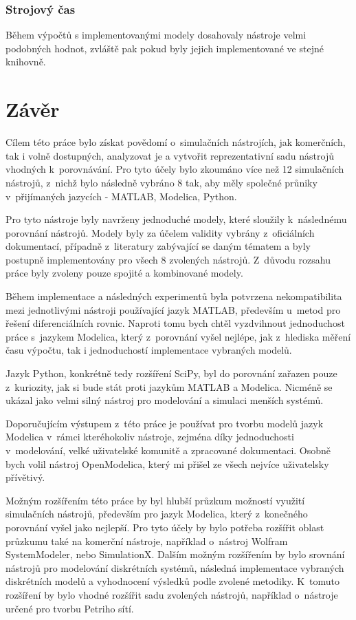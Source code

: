 

\subsection*{Strojový čas}
Během výpočtů s implementovanými modely dosahovaly nástroje velmi podobných hodnot, zvláště pak pokud byly jejich implementované ve stejné knihovně. 
\chapter{Závěr}
\label{kapitola6}

Cílem této práce bylo získat povědomí o~simulačních nástrojích, jak komerčních, tak i volně dostupných, analyzovat je a vytvořit reprezentativní sadu nástrojů vhodných k~porovnávání. Pro tyto účely bylo zkoumáno více než 12 simulačních nástrojů, z~nichž bylo následně vybráno 8 tak, aby měly společné průniky v~přijímaných jazycích - MATLAB, Modelica, Python. 

Pro tyto nástroje byly navrženy jednoduché modely, které sloužily k~následnému porovnání nástrojů. Modely byly za účelem validity vybrány z~oficiálních dokumentací, případně z~literatury zabývající se daným tématem a byly postupně implementovány pro všech 8 zvolených nástrojů. Z~důvodu rozsahu práce byly zvoleny pouze spojité a kombinované modely. 

Během implementace a následných experimentů byla potvrzena nekompatibilita mezi jednotlivými nástroji používající jazyk MATLAB, především u~metod pro řešení diferenciálních rovnic. Naproti tomu bych chtěl vyzdvihnout jednoduchost práce s~jazykem Modelica, který z~porovnání vyšel nejlépe, jak z~hlediska měření času výpočtu, tak i jednoduchostí implementace vybraných modelů. 

Jazyk Python, konkrétně tedy rozšíření SciPy, byl do porovnání zařazen pouze z~kuriozity, jak si bude stát proti jazykům MATLAB a Modelica. Nicméně se ukázal jako velmi silný nástroj pro modelování a simulaci menších systémů. 

Doporučujícím výstupem z~této práce je používat pro tvorbu modelů jazyk Modelica v~rámci kteréhokoliv nástroje, zejména díky jednoduchosti v~modelování, velké uživatelské komunitě a zpracované dokumentaci. Osobně bych volil nástroj OpenModelica, který mi přišel ze všech nejvíce uživatelsky přívětivý.

Možným rozšířením této práce by byl hlubší průzkum možností využití simulačních nástrojů, především pro jazyk Modelica, který z~konečného porovnání vyšel jako nejlepší. Pro tyto účely by bylo potřeba rozšířit oblast průzkumu také na komerční nástroje, například o~nástroj Wolfram SystemModeler, nebo SimulationX. Dalším možným rozšířením by bylo srovnání nástrojů pro modelování diskrétních systémů, následná implementace vybraných diskrétních modelů a vyhodnocení výsledků podle zvolené metodiky. K~tomuto rozšíření by bylo vhodné rozšířit sadu zvolených nástrojů, například o~nástroje určené pro tvorbu Petriho sítí. 



